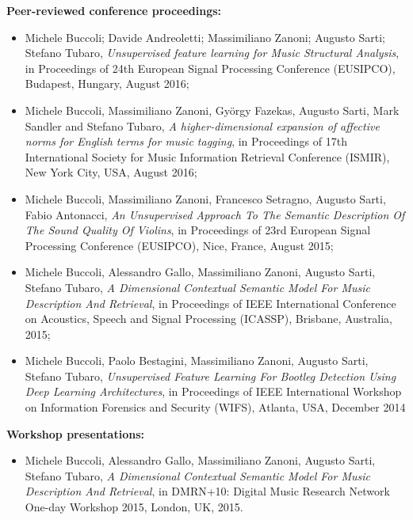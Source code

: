 \textbf{Peer-reviewed conference proceedings:}
\begin{itemize}
\item Michele Buccoli; Davide Andreoletti; Massimiliano Zanoni; Augusto Sarti; Stefano Tubaro, \textit{Unsupervised feature learning for Music Structural Analysis}, in Proceedings of 24th European Signal Processing Conference (EUSIPCO), Budapest, Hungary, August 2016;
\item Michele Buccoli, Massimiliano Zanoni, Gy\"orgy Fazekas, Augusto Sarti, Mark Sandler and Stefano Tubaro, \textit{A higher-dimensional expansion of affective norms for English terms for music tagging}, in Proceedings of 17th International Society for Music Information Retrieval Conference (ISMIR), New York City, USA, August 2016;
\item Michele Buccoli, Massimiliano Zanoni, Francesco Setragno, Augusto Sarti, Fabio Antonacci, \textit{An Unsupervised Approach To The Semantic Description Of The Sound Quality Of Violins}, in Proceedings of 23rd European Signal Processing Conference (EUSIPCO), Nice, France, August 2015;
\item Michele Buccoli, Alessandro Gallo, Massimiliano Zanoni, Augusto Sarti, Stefano Tubaro, \textit{A Dimensional Contextual Semantic Model For Music Description And Retrieval}, in Proceedings of IEEE International Conference on Acoustics, Speech and Signal Processing (ICASSP), Brisbane, Australia, 2015;
\item Michele Buccoli, Paolo Bestagini, Massimiliano Zanoni, Augusto Sarti, Stefano Tubaro, \textit{Unsupervised Feature Learning For Bootleg Detection Using Deep Learning Architectures}, in Proceedings of IEEE International Workshop on Information Forensics and Security (WIFS), Atlanta, USA, December 2014

\end{itemize}

\textbf{Workshop presentations:}
\begin{itemize}
\item Michele Buccoli, Alessandro Gallo, Massimiliano Zanoni, Augusto Sarti, Stefano Tubaro, \textit{A Dimensional Contextual Semantic Model For Music Description And Retrieval}, in DMRN+10: Digital Music Research Network One-day Workshop 2015, London, UK, 2015.
\end{itemize}



